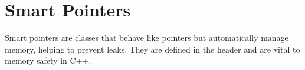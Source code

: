 \documentclass[12pt]{article}
\begin{document}
\tableofcontents

\pagebreak

\section{Smart Pointers}

Smart pointers are classes that behave like pointers but automatically manage memory, helping to prevent leaks.
They are defined in the  header and are vital to memory safety in C++.
\end{document}
